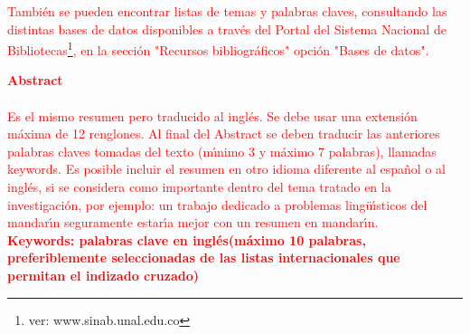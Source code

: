\textcolor{red}{
Tambi\'{e}n se pueden encontrar listas de temas y palabras claves, consultando las distintas bases de datos disponibles a trav\'{e}s del Portal del Sistema Nacional de Bibliotecas\footnote{ver: www.sinab.unal.edu.co}, en la secci\'{o}n "Recursos bibliogr\'{a}ficos" opci\'{o}n "Bases de datos".\\
}

\textcolor{red}{
\textbf{\LARGE Abstract}\\\\
Es el mismo resumen pero traducido al ingl\'{e}s. Se debe usar una extensi\'{o}n m\'{a}xima de 12 renglones. Al final del Abstract se deben traducir las anteriores palabras claves tomadas del texto (m\'{\i}nimo 3 y m\'{a}ximo 7 palabras), llamadas keywords. Es posible incluir el resumen en otro idioma diferente al espa\~{n}ol o al ingl\'{e}s, si se considera como importante dentro del tema tratado en la investigaci\'{o}n, por ejemplo: un trabajo dedicado a problemas ling\"{u}\'{\i}sticos del mandar\'{\i}n seguramente estar\'{\i}a mejor con un resumen en mandar\'{\i}n.}\\[2.0cm]

\textcolor{red}{
\textbf{\small Keywords: palabras clave en ingl\'{e}s(m\'{a}ximo 10 palabras, preferiblemente seleccionadas de las listas internacionales que permitan el indizado cruzado)}\\
}